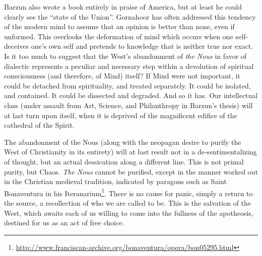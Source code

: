 Barzun also wrote a book entirely in praise of America, but at least he could clearly see the ``state of the Union''. Gornahoor has often addressed this tendency of the modern mind to assume that an opinion is better than none, even if unformed. This overlooks the deformation of mind which occurs when one self-deceives one's own self and pretends to knowledge that is neither true nor exact. Is it too much to suggest that the West's abandonment of \emph{the Nous} in favor of dialectic represents a peculiar and necessary step within a devolution of spiritual consciousness (and therefore, of Mind) itself? If Mind were not important, it could be detached from spirituality, and treated separately. It could be isolated, and contained. It could be dissected and degraded. And so it has. Our intellectual class (under assault from Art, Science, and Philanthropy in Barzun's thesis) will at last turn upon itself, when it is deprived of the magnificent edifice of the cathedral of the Spirit.

The abandonment of the Nous (along with the neopagan desire to purify the West of Christianity in its entirety) will at last result not in a de-sentimentalizing of thought, but an actual dessication along a different line. This is not primal purity, but Chaos. \emph{The Nous} cannot be purified, except in the manner worked out in the Christian medieval tradition, indicated by paragons such as Saint Bonaventura in his Iteranarium\footnote{\url{http://www.franciscan-archive.org/bonaventura/opera/bon05295.html}}. There is no cause for panic, simply a return to the source, a recollection of who we are called to be. This is the salvation of the West, which awaits each of us willing to come into the fullness of the apotheosis, destined for us as an act of free choice.



